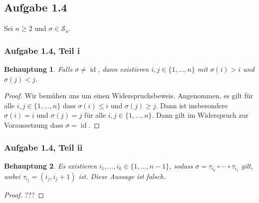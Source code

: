\documentclass[draft,a5paper]{article}
\newtheorem*{beh}{Behauptung}
\DeclareMathOperator{\id}{id}
\begin{document}
\subsection*{Aufgabe 1.4}

Sei \(n \ge 2\) und \(\sigma \in \mathcal{S}_{n}\).

\subsubsection*{Aufgabe 1.4, Teil i}

\begin{beh}
  Falls \(\sigma \ne \id\), dann existieren \(i, j \in \{1, \ldots, n\}\) mit \(\sigma(i)
  > i\) und \(\sigma(j) < j\).
\end{beh}

\begin{proof}
  Wir bemühen uns um einen Widerspruchsbeweis.  Angenommen, es gilt
  für alle \(i, j \in \{1, \ldots, n\}\) dass \(\sigma(i) \le i\) und
  \(\sigma(j) \ge j\).  Dann ist insbesondere \(\sigma(i) = i\) und
  \(\sigma(j) = j\) für alle \(i, j \in \{1, \ldots, n\}\).  Dann gilt im
  Widerspruch zur Voraussetzung dass \(\sigma = \id\).
\end{proof}

\subsubsection*{Aufgabe 1.4, Teil ii}

\begin{beh}
  Es existieren \(i_{1}, \ldots, i_{k} \in \{1, \ldots, n - 1\}\), sodass \(\sigma =
  \tau_{i_{k}} \circ \cdots \circ \tau_{i_{1}}\) gilt, wobei \(\tau_{i_{j}} = (i_{j}, i_{j}
  + 1)\) ist.  Diese Aussage ist falsch.
\end{beh}

\begin{proof}
  ???
\end{proof}
\end{document}
